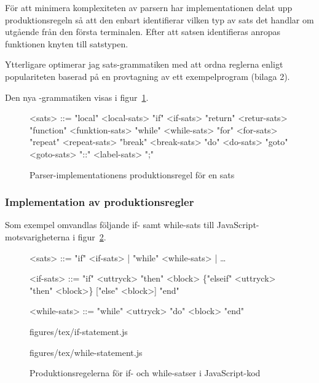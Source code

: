 För att minimera komplexiteten av parsern har implementationen delat upp
produktionsregeln  så att den enbart identifierar vilken typ av
sats det handlar om utgående från den första terminalen. Efter att satsen
identifieras anropas funktionen knyten till satstypen.

Ytterligare optimerar jag sats-grammatiken med att ordna reglerna enligt
populariteten baserad på en provtagning av ett exempelprogram (bilaga 2).

Den nya -grammatiken visas i figur~\ref{fig:stat}.

\begin{figure}[ht]
  \setlength{\grammarindent}{5em}
  \begin{grammar}
    \singlespace\small%
    \selectfont
    <sats> ::= "local" <local-sats>
      \alt "if" <if-sats>
      \alt "return" <retur-sats>
      \alt "function" <funktion-sats>
      \alt "while" <while-sats>
      \alt "for" <for-sats>
      \alt "repeat" <repeat-sats>
      \alt "break" <break-sats>
      \alt "do" <do-sats>
      \alt "goto" <goto-sats>
      \alt "::" <label-sats>
      \alt ";"
  \end{grammar}
  \caption{Parser-implementationens produktionsregel för en sats}
  \label{fig:stat}
\end{figure}

\subsubsection{Implementation av produktionsregler}

Som exempel omvandlas följande if- samt while-sats till
JavaScript-motsvarigheterna i figur~\ref{fig:ifstat}.

\begin{figure}[ht]
  \setlength{\grammarindent}{3em}
  \begin{grammar}
    \singlespace\small%
    \selectfont
      <sats> ::= "if" <if-sats> | "while" <while-sats> | \ldots

      <if-sats> ::= "if" <uttryck> "then" <block> \{"elseif" <uttryck> "then" <block>\}
      ["else" <block>] "end"

      <while-sats> ::= "while" <uttryck> "do" <block> "end"
  \end{grammar}
  \begin{minipage}[t]{0.5\textwidth}
    {figures/tex/if-statement.js}
  \end{minipage}
  \begin{minipage}[t]{0.5\textwidth}
    {figures/tex/while-statement.js}
  \end{minipage}
  \caption{Produktionsregelerna för if- och while-satser i JavaScript-kod}
  \label{fig:ifstat}
\end{figure}

